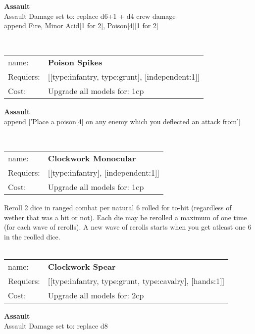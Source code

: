 {\bf Assault} \ \\
Assault Damage set to: replace d6+1 + d4 crew damage
\\ 

append Fire, Minor Acid[1 for 2], Poison[4][1 for 2]


\ \\
\begin{tabular}{ll}
name: & {\bf Poison Spikes } \\
Requiers: & [[type:infantry, type:grunt], [independent:1]] \\
Cost: & Upgrade all models for: 1cp \\
\end{tabular}





{\bf Assault} \ \\

append ['Place a poison[4] on any enemy which you deflected an attack from']


\ \\
\begin{tabular}{ll}
name: & {\bf Clockwork Monocular } \\
Requiers: & [[type:infantry], [independent:1]] \\
Cost: & Upgrade all models for: 1cp \\
\end{tabular}

Reroll 2 dice in ranged combat per natural 6 rolled for to-hit (regardless of wether that was a hit or not). Each die may be rerolled a maximum of one time (for each wave of rerolls). A new wave of rerolls starts when you get atleast one 6 in the reolled dice.\\ 









\ \\
\begin{tabular}{ll}
name: & {\bf Clockwork Spear } \\
Requiers: & [[type:infantry, type:grunt, type:cavalry], [hands:1]] \\
Cost: & Upgrade all models for: 2cp \\
\end{tabular}





{\bf Assault} \ \\
Assault Damage set to: replace d8
\\ 

